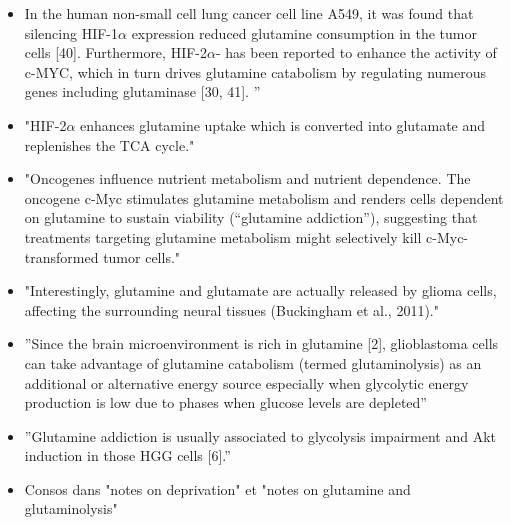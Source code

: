 \documentclass[11pt,a4paper]{article}
\begin{document}
\begin{itemize}
\item In the human non-small cell lung cancer cell line A549, it was found that silencing HIF-1$\alpha$ expression reduced glutamine consumption in the tumor cells [40]. Furthermore, HIF-2$\alpha$-
has been reported to enhance the activity of c-MYC, which in turn drives glutamine
catabolism by regulating numerous genes including glutaminase [30, 41]. ”\cite{Ma2022}
\item "HIF-2$\alpha$ enhances glutamine uptake which is
converted into glutamate and replenishes the TCA cycle." \cite{Mudassar2020}
\item "Oncogenes influence nutrient metabolism and nutrient dependence. The oncogene c-Myc stimulates glutamine metabolism and renders cells dependent on glutamine to sustain viability (“glutamine addiction”), suggesting that treatments targeting glutamine metabolism might selectively kill c-Myc-transformed tumor cells."\cite{Yang2009}
\item "Interestingly, glutamine and glutamate are actually released by glioma cells, affecting the surrounding neural tissues (Buckingham et al., 2011)."\cite{Strickland2017}
\item ”Since the brain microenvironment is rich in glutamine [2], glioblastoma cells can take advantage of glutamine catabolism (termed glutaminolysis) as an additional or alternative energy source especially when glycolytic energy production is low due to phases when glucose levels are depleted”\cite{Stuart2023}
\item ”Glutamine addiction is usually associated to glycolysis impairment and Akt induction in those HGG cells [6].”\cite{Fuchs2020}
\item Consos dans "notes on deprivation" et "notes on glutamine and glutaminolysis" 
\end{itemize}
\end{document}
